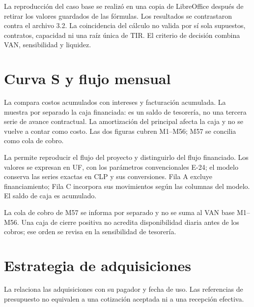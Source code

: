 La reproducción del caso base se realizó en una copia de LibreOffice después de retirar los
valores guardados de las fórmulas. Los resultados se contrastaron contra el archivo 3.2. La
coincidencia del cálculo no valida por sí sola supuestos, contratos, capacidad ni una raíz
única de TIR. El criterio de decisión combina VAN, sensibilidad y liquidez.

\section{Curva S y flujo mensual}\label{sec:eco-curva}
La  compara costos acumulados con intereses y facturación acumulada.
La  muestra por separado la caja financiada: es un saldo de tesorería,
no una tercera serie de avance contractual. La amortización del principal afecta la caja y no
se vuelve a contar como costo. Las dos figuras cubren M1--M56; M57 se concilia como cola de cobro.


La  permite reproducir el flujo del proyecto y distinguirlo del
flujo financiado. Los valores se expresan en UF, con los parámetros convencionales E-24;
el modelo conserva las series exactas en CLP y sus conversiones. Fila A excluye financiamiento;
Fila C incorpora sus movimientos según las columnas del modelo. El saldo de caja es acumulado.



La cola de cobro de M57 se informa por separado y no se suma al VAN base M1--M56. Una caja
de cierre positiva no acredita disponibilidad diaria antes de los cobros; ese orden se revisa
en la sensibilidad de tesorería.

\section{Estrategia de adquisiciones}\label{sec:eco-estrategia}
La  relaciona las adquisiciones con su pagador y fecha de uso. Las referencias
de presupuesto no equivalen a una cotización aceptada ni a una recepción efectiva.

